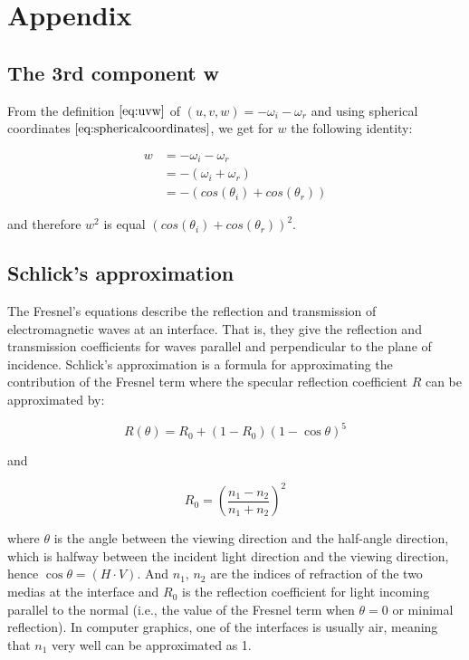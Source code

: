 \chapter{Appendix}
\section{The 3rd component w}
\label{sec:componentw}
From the definition $\ref{eq:uvw}$ of $(u,v,w)= -\omega_i - \omega_r$ and using spherical coordinates $\ref{eq:sphericalcoordinates}$, we get for $w$ the following identity:

\begin{align}
w 
&= -\omega_i - \omega_r \nonumber \\ 
&= -(\omega_i + \omega_r) \nonumber \\
&= -\left( cos(\theta_i)+cos(\theta_r) \right) 
\label{eq:sphericalomega}
\end{align}

and therefore $w^2$ is equal $(cos(\theta_i)+cos(\theta_r))^2$. 

\section{Schlick's approximation}
The Fresnel's equations describe the reflection and transmission of electromagnetic waves at an interface. That is, they give the reflection and transmission coefficients for waves parallel and perpendicular to the plane of incidence. Schlick's approximation is a formula for approximating the contribution of the Fresnel term where the specular reflection coefficient $R$ can be approximated by:

\begin{equation}
 R(\theta) = R_0 + (1 - R_0)(1 - \cos \theta)^5
\label{eq:schlickapprox}
\end{equation}

and

\begin{equation*}
  R_0 = \left(\frac{n_1-n_2}{n_1+n_2}\right)^2
\end{equation*}

where $\theta$ is the angle between the viewing direction and the half-angle direction, which is halfway between the incident 
light direction and the viewing direction, hence $\cos\theta=(H\cdot V)$. And $n_1,\,n_2$ are the indices of refraction of the two medias at the interface and $R_0$ is the reflection coefficient for light incoming parallel to the normal (i.e., the value of the Fresnel term when $\theta = 0$ or minimal reflection). In computer graphics, one of the interfaces is usually air, meaning that $n_1$ very well can be approximated as 1.

